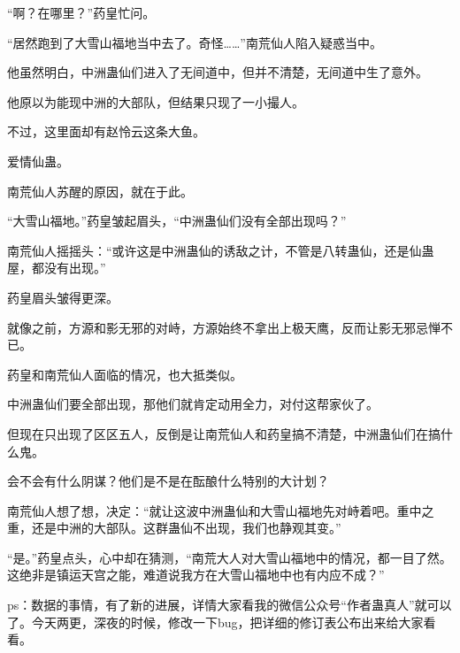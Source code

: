 \begin{this_body}
“啊？在哪里？”药皇忙问。

“居然跑到了大雪山福地当中去了。奇怪……”南荒仙人陷入疑惑当中。

他虽然明白，中洲蛊仙们进入了无间道中，但并不清楚，无间道中生了意外。

他原以为能现中洲的大部队，但结果只现了一小撮人。

不过，这里面却有赵怜云这条大鱼。

爱情仙蛊。

南荒仙人苏醒的原因，就在于此。

“大雪山福地。”药皇皱起眉头，“中洲蛊仙们没有全部出现吗？”

南荒仙人摇摇头：“或许这是中洲蛊仙的诱敌之计，不管是八转蛊仙，还是仙蛊屋，都没有出现。”

药皇眉头皱得更深。

就像之前，方源和影无邪的对峙，方源始终不拿出上极天鹰，反而让影无邪忌惮不已。

药皇和南荒仙人面临的情况，也大抵类似。

中洲蛊仙们要全部出现，那他们就肯定动用全力，对付这帮家伙了。

但现在只出现了区区五人，反倒是让南荒仙人和药皇搞不清楚，中洲蛊仙们在搞什么鬼。

会不会有什么阴谋？他们是不是在酝酿什么特别的大计划？

南荒仙人想了想，决定：“就让这波中洲蛊仙和大雪山福地先对峙着吧。重中之重，还是中洲的大部队。这群蛊仙不出现，我们也静观其变。”

“是。”药皇点头，心中却在猜测，“南荒大人对大雪山福地中的情况，都一目了然。这绝非是镇运天宫之能，难道说我方在大雪山福地中也有内应不成？”

ps：数据的事情，有了新的进展，详情大家看我的微信公众号“作者蛊真人”就可以了。今天两更，深夜的时候，修改一下bug，把详细的修订表公布出来给大家看看。

\end{this_body}

